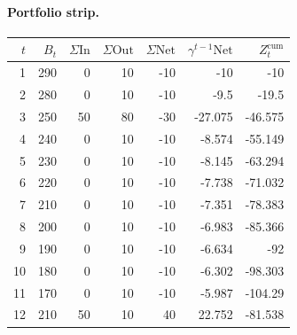 \documentclass[12pt, a4paper]{article}
\begin{document}
\paragraph{Portfolio strip.}
\begin{center}
\begin{tabular}{rrrrrrr}
\toprule
$t$ & $B_t$ & $\Sigma\mathrm{In}$ & $\Sigma\mathrm{Out}$ & $\Sigma\mathrm{Net}$ & $\gamma^{t-1}\mathrm{Net}$ & $Z_t^{\mathrm{cum}}$\\
\midrule
1 & 290 & 0 & 10 & -10 & -10 & -10 \\
2 & 280 & 0 & 10 & -10 & -9.5 & -19.5 \\
3 & 250 & 50 & 80 & -30 & -27.075 & -46.575 \\
4 & 240 & 0 & 10 & -10 & -8.574 & -55.149 \\
5 & 230 & 0 & 10 & -10 & -8.145 & -63.294 \\
6 & 220 & 0 & 10 & -10 & -7.738 & -71.032 \\
7 & 210 & 0 & 10 & -10 & -7.351 & -78.383 \\
8 & 200 & 0 & 10 & -10 & -6.983 & -85.366 \\
9 & 190 & 0 & 10 & -10 & -6.634 & -92 \\
10 & 180 & 0 & 10 & -10 & -6.302 & -98.303 \\
11 & 170 & 0 & 10 & -10 & -5.987 & -104.29 \\
12 & 210 & 50 & 10 & 40 & 22.752 & -81.538 \\
\bottomrule
\end{tabular}
\end{center}
\end{document}
